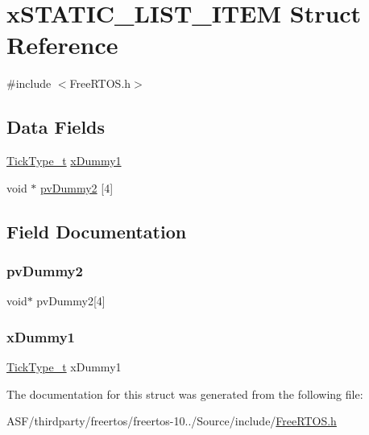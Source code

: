 \hypertarget{structx_s_t_a_t_i_c___l_i_s_t___i_t_e_m}{}\section{x\+S\+T\+A\+T\+I\+C\+\_\+\+L\+I\+S\+T\+\_\+\+I\+T\+EM Struct Reference}
\label{structx_s_t_a_t_i_c___l_i_s_t___i_t_e_m}


{\ttfamily \#include $<$Free\+R\+T\+O\+S.\+h$>$}

\subsection*{Data Fields}
\begin{DoxyCompactItemize}
\item 
\mbox{\hyperlink{portmacro_8h_aa69c48c6e902ce54f70886e6573c92a9}{Tick\+Type\+\_\+t}} \mbox{\hyperlink{structx_s_t_a_t_i_c___l_i_s_t___i_t_e_m_a7eacc6e12219b6aee0a8838ae4d5fa67}{x\+Dummy1}}
\item 
void $\ast$ \mbox{\hyperlink{structx_s_t_a_t_i_c___l_i_s_t___i_t_e_m_adf39af1efe87f452d7c2213ca93110a5}{pv\+Dummy2}} \mbox{[}4\mbox{]}
\end{DoxyCompactItemize}


\subsection{Field Documentation}
\mbox{\label{structx_s_t_a_t_i_c___l_i_s_t___i_t_e_m_adf39af1efe87f452d7c2213ca93110a5}} 
\subsubsection{\texorpdfstring{pvDummy2}{pvDummy2}}
{\footnotesize\ttfamily void$\ast$ pv\+Dummy2\mbox{[}4\mbox{]}}

\mbox{\label{structx_s_t_a_t_i_c___l_i_s_t___i_t_e_m_a7eacc6e12219b6aee0a8838ae4d5fa67}} 
\subsubsection{\texorpdfstring{xDummy1}{xDummy1}}
{\footnotesize\ttfamily \mbox{\hyperlink{portmacro_8h_aa69c48c6e902ce54f70886e6573c92a9}{Tick\+Type\+\_\+t}} x\+Dummy1}



The documentation for this struct was generated from the following file\+:\begin{DoxyCompactItemize}
\item 
A\+S\+F/thirdparty/freertos/freertos-\/10../\+Source/include/\mbox{\hyperlink{_free_r_t_o_s_8h}{Free\+R\+T\+O\+S.\+h}}\end{DoxyCompactItemize}
